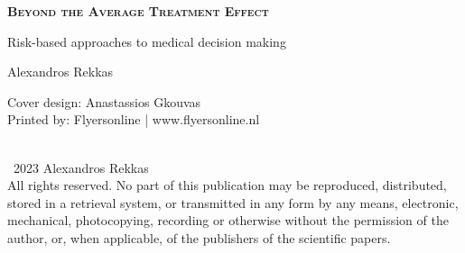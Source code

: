 


\clearpage\null\pagestyle{empty}
\newpage


\pagestyle{empty}

\def\drop{.1\textheight}

\vspace*{6cm}
\begin{center}
\Large \textbf{\textsc{Beyond the Average Treatment Effect}}\par
\Large Risk-based approaches to medical decision making \par

\vspace*{1.8cm}

\Large Alexandros Rekkas

\end{center}

\clearpage

\thispagestyle{empty}
\vspace*{12cm}

\begingroup %
\small
\setlength{\parskip}{\baselineskip} %
\setlength\parindent{0pt} %
Cover design: Anastassios Gkouvas \\
Printed by: Flyersonline | www.flyersonline.nl\\
\\
\begin{flushleft}
\textcopyright\ 2023 Alexandros Rekkas \\
All rights reserved. No part of this publication may be reproduced, distributed,
stored in a retrieval system, or transmitted in any form by any means, electronic,
mechanical, photocopying, recording or otherwise without the permission of the
author, or, when applicable, of the publishers of the scientific papers.
\end{flushleft}

\endgroup

\newpage
\thispagestyle{empty}

